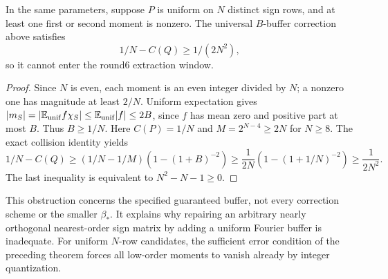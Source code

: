 \begin{theorem}
In the same parameters, suppose $P$ is uniform on $N$ distinct sign
rows, and at least one first or second moment is nonzero. The universal
$B$-buffer correction above satisfies
\[
 1/N-C(Q)\ge1/(2N^2),
\]
so it cannot enter the round6 extraction window.
\end{theorem}
\begin{proof}
Since $N$ is even, each moment is an even integer divided by $N$;
a nonzero one has magnitude at least $2/N$. Uniform expectation
gives $|m_S|=|\mathbb E_{\rm unif} f\chi_S|
\le\mathbb E_{\rm unif}|f|\le2B$, since $f$ has mean zero
and positive part at most $B$. Thus $B\ge1/N$.
Here $C(P)=1/N$ and $M=2^{N-4}\ge2N$ for $N\ge8$.
The exact collision identity yields
\[
 1/N-C(Q)\ge(1/N-1/M)\left(1-(1+B)^{-2}\right)
 \ge\frac1{2N}\left(1-(1+1/N)^{-2}\right)
 \ge\frac1{2N^2}.
\]
The last inequality is equivalent to $N^2-N-1\ge0$.
\end{proof}
This obstruction concerns the specified guaranteed buffer, not every
correction scheme or the smaller $\beta_*$. It explains why repairing
an arbitrary nearly orthogonal nearest-order sign matrix by adding a
uniform Fourier buffer is inadequate. For uniform $N$-row candidates,
the sufficient error condition of the preceding theorem forces all
low-order moments to vanish already by integer quantization.

